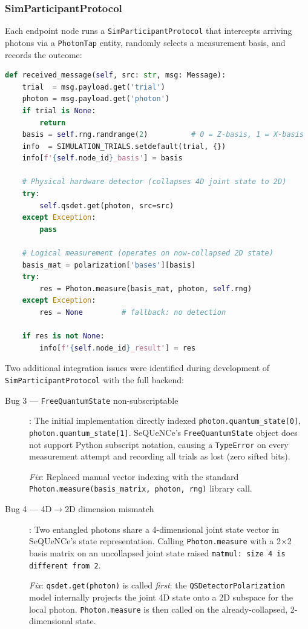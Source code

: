 \documentclass[12pt,oneside,letterpaper,english]{article}
\begin{document}
\subsubsection{SimParticipantProtocol}

Each endpoint node runs a \texttt{SimParticipantProtocol} that intercepts arriving photons via a \texttt{PhotonTap} entity, randomly selects a measurement basis, and records the outcome:

\begin{lstlisting}[language=Python, caption={Endpoint measurement protocol}]
def received_message(self, src: str, msg: Message):
    trial  = msg.payload.get('trial')
    photon = msg.payload.get('photon')
    if trial is None:
        return
    basis = self.rng.randrange(2)          # 0 = Z-basis, 1 = X-basis
    info  = SIMULATION_TRIALS.setdefault(trial, {})
    info[f'{self.node_id}_basis'] = basis

    # Physical hardware detector (collapses 4D joint state to 2D)
    try:
        self.qsdet.get(photon, src=src)
    except Exception:
        pass

    # Logical measurement (operates on now-collapsed 2D state)
    basis_mat = polarization['bases'][basis]
    try:
        res = Photon.measure(basis_mat, photon, self.rng)
    except Exception:
        res = None         # fallback: no detection

    if res is not None:
        info[f'{self.node_id}_result'] = res
\end{lstlisting}

Two additional integration issues were identified during development of \texttt{SimParticipantProtocol} with the full backend:

\begin{description}
    \item[Bug 3 --- \texttt{FreeQuantumState} non-subscriptable]: The initial implementation directly indexed \texttt{photon.quantum\_state[0]}, \texttt{photon.quantum\_state[1]}. SeQUeNCe's \texttt{FreeQuantumState} object does not support Python subscript notation, causing a \texttt{TypeError} on every measurement attempt and recording all trials as lost (zero sifted bits).

    \textit{Fix}: Replaced manual vector indexing with the standard \texttt{Photon.measure(basis\_matrix, photon, rng)} library call.
    
    \item[Bug 4 --- 4D$\to$2D dimension mismatch]: Two entangled photons share a 4-dimensional joint state vector in SeQUeNCe's state representation. Calling \texttt{Photon.measure} with a 2$\times$2 basis matrix on an uncollapsed joint state raised \texttt{matmul: size 4 is different from 2}.
    
    \textit{Fix}: \texttt{qsdet.get(photon)} is called \emph{first}: the \texttt{QSDetectorPolarization} model internally projects the joint 4D state onto a 2D subspace for the local photon. \texttt{Photon.measure} is then called on the already-collapsed, 2-dimensional state.
\end{description}
\end{document}
